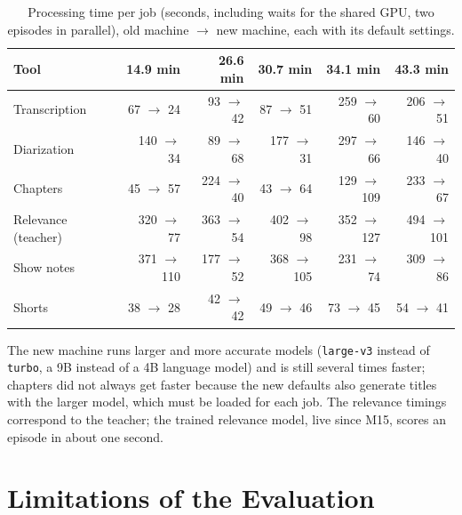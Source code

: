 \begin{table}[H]
\centering
\caption{Processing time per job (seconds, including waits for the shared GPU, two episodes in parallel), old machine $\rightarrow$ new machine, each with its default settings.}
\label{tab:e2e}
\small
\begin{tabular}{@{}lrrrrr@{}}
\toprule
\textbf{Tool} & \textbf{14.9 min} & \textbf{26.6 min} & \textbf{30.7 min} & \textbf{34.1 min} & \textbf{43.3 min} \\
\midrule
Transcription & 67 $\rightarrow$ 24 & 93 $\rightarrow$ 42 & 87 $\rightarrow$ 51 & 259 $\rightarrow$ 60 & 206 $\rightarrow$ 51 \\
Diarization & 140 $\rightarrow$ 34 & 89 $\rightarrow$ 68 & 177 $\rightarrow$ 31 & 297 $\rightarrow$ 66 & 146 $\rightarrow$ 40 \\
Chapters & 45 $\rightarrow$ 57 & 224 $\rightarrow$ 40 & 43 $\rightarrow$ 64 & 129 $\rightarrow$ 109 & 233 $\rightarrow$ 67 \\
Relevance (teacher) & 320 $\rightarrow$ 77 & 363 $\rightarrow$ 54 & 402 $\rightarrow$ 98 & 352 $\rightarrow$ 127 & 494 $\rightarrow$ 101 \\
Show notes & 371 $\rightarrow$ 110 & 177 $\rightarrow$ 52 & 368 $\rightarrow$ 105 & 231 $\rightarrow$ 74 & 309 $\rightarrow$ 86 \\
Shorts & 38 $\rightarrow$ 28 & 42 $\rightarrow$ 42 & 49 $\rightarrow$ 46 & 73 $\rightarrow$ 45 & 54 $\rightarrow$ 41 \\
\bottomrule
\end{tabular}
\end{table}

The new machine runs larger and more accurate models (\texttt{large-v3} instead of \texttt{turbo}, a 9B instead of a 4B language model) and is still several times faster; chapters did not always get faster because the new defaults also generate titles with the larger model, which must be loaded for each job. The relevance timings correspond to the teacher; the trained relevance model, live since M15, scores an episode in about one second.

\section{Limitations of the Evaluation}
\label{s:limitations}

